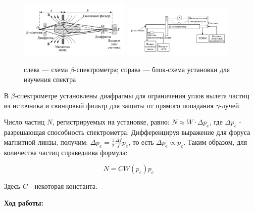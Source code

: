 \documentclass[a4paper, 12pt]{article}%
\begin{document}
	\begin{figure}[h]
		\centering
		\includegraphics[width=0.48\textwidth]{lab}
		\hfill
		\includegraphics[width=0.48\textwidth]{lab2}
		\caption{слева --- схема $\beta$-спектрометра; справа --- блок-схема установки для изучения спектра}
		\label{pic:scheme}
	\end{figure}
	
	В $\beta$-спектрометре установлены диафрагмы для ограничения углов вылета частиц из источника и свинцовый фильтр для защиты от прямого попадания $\gamma$-лучей. 
	
	Число частиц $N$, регистрируемых на установке, равно: $N \approx W \cdot \Delta p_e$, где $\Delta p_e$ - разрешающая способность спектрометра. Дифференцируя выражение для форуса магнитной линзы, получим: $\Delta p_e = \frac{1}{2}\frac{\Delta f}{f}p_e$, то есть $\Delta p_e \propto p_e$. Таким образом, для количества частиц справедлива формула: 
	
	\begin{equation}\label{N}
		N = CW(p_e)p_e 
	\end{equation}
	
	Здесь $C$ - некоторая константа.\\
	\newpage
	
	
	\textbf{Ход работы: }\\
	
\end{document}
